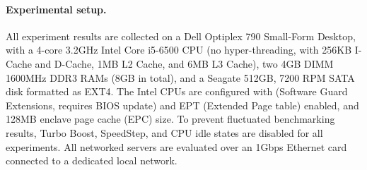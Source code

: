 


\paragraph{Experimental setup.}

All experiment results are collected on a Dell Optiplex 790 Small-Form Desktop,
with a 4-core 3.2GHz Intel Core i5-6500 CPU (no hyper-threading, with 256KB I-Cache and D-Cache, 1MB L2 Cache, and 6MB L3 Cache),
two 4GB DIMM 1600MHz DDR3 RAMs (8GB in total), and a Seagate 512GB, 7200 RPM SATA disk formatted as EXT4.
The Intel CPUs are configured with \sgx{} (Software Guard Extensions, requires BIOS update) and EPT (Extended Page table) enabled, and 128MB enclave page cache (EPC) size.
To prevent fluctuated benchmarking results,
Turbo Boost, SpeedStep, and CPU idle states are disabled for
all experiments.
All networked servers are evaluated over an 1Gbps Ethernet card connected to a dedicated local network.



